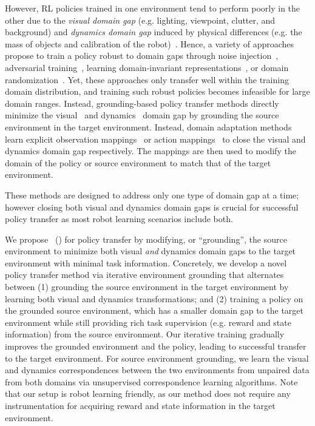 However, RL policies trained in one environment tend to perform poorly in the other due to the \textit{visual domain gap} (e.g. lighting, viewpoint, clutter, and background) and \textit{dynamics domain gap} induced by physical differences (e.g. the mass of objects and calibration of the robot)~\citep{jakobi1995noise, tobin2017domain, peng2018sim}.
Hence, a variety of approaches propose to train a policy robust to domain gaps through noise injection~\citep{jakobi1995noise}, adversarial training~\citep{ganin2016domain, pinto2017robust, rajeswaran2017epopt}, learning domain-invariant representations~\citep{gupta2017learning}, or domain randomization~\citep{tobin2017domain, james2019sim, peng2018sim}. 
Yet, these approaches only transfer well within the training domain distribution, and training such robust policies becomes infeasible for large domain ranges. 
Instead, grounding-based policy transfer methods directly minimize the visual~\citep{rao2020rl, bousmalis2018using} and dynamics~\citep{hanna2017grounded, desai2020imitation} domain gap by grounding the source environment in the target environment.
Instead, domain adaptation methods learn explicit observation mappings~\citep{rao2020rl, bousmalis2018using} or action mappings~\citep{hanna2017grounded, desai2020imitation} to close the visual and dynamics domain gap respectively.  The mappings are then used to modify the domain of the policy or source environment to match that of the target environment.

These methods are designed to address only one type of domain gap at a time; however closing both visual and dynamics domain gaps is crucial for successful policy transfer as most robot learning scenarios include both. 

We propose \fullmethod~(\method) for policy transfer by modifying, or ``grounding'', the source environment to minimize both visual \textit{and} dynamics domain gaps to the target environment with minimal task information.
Concretely, we develop a novel policy transfer method via iterative environment grounding that alternates between (1) grounding the source environment in the target environment by learning both visual and dynamics transformations; and (2) training a policy on the grounded source environment, which has a smaller domain gap to the target environment while  still providing rich task supervision (e.g. reward and state information) from the source environment. 
Our iterative training gradually improves the grounded environment and the policy, leading to successful transfer to the target environment. For source environment grounding, we learn the visual and dynamics correspondences between the two environments from unpaired data from both domains via unsupervised correspondence learning algorithms. 
Note that our setup is robot learning friendly, as our method does not require any instrumentation for acquiring reward and state information in the target environment.

